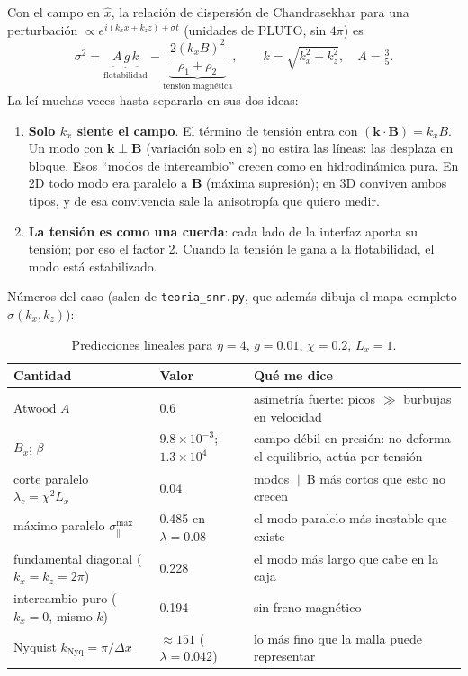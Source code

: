 \documentclass[11pt,a4paper]{article}
\begin{document}
Con el campo en $\hat{x}$, la relación de dispersión de Chandrasekhar
\cite{chandra1961} para una perturbación $\propto e^{i(k_x x+k_z z)+\sigma t}$ (unidades
de PLUTO, sin $4\pi$) es
\begin{equation}
\sigma^2 = \underbrace{A\,g\,k}_{\text{flotabilidad}}
-\underbrace{\frac{2(k_xB)^2}{\rho_1+\rho_2}}_{\text{tensión magnética}},
\qquad k=\sqrt{k_x^2+k_z^2},\quad A=\tfrac{3}{5}.
\label{eq:disp}
\end{equation}
La leí muchas veces hasta separarla en sus dos ideas:
\begin{enumerate}
  \item \textbf{Solo $k_x$ siente el campo}. El término de tensión entra con
  $(\mathbf{k}\cdot\mathbf{B})=k_xB$. Un modo con $\mathbf{k}\perp\mathbf{B}$ (variación
  solo en $z$) no estira las líneas: las desplaza en bloque. Esos ``modos de intercambio'' crecen como en hidrodinámica pura.
  En 2D todo modo era paralelo a $\mathbf{B}$ (máxima supresión); en 3D conviven ambos
  tipos, y de esa convivencia sale la anisotropía que quiero medir.
  \item \textbf{La tensión es como una cuerda}: cada lado de la interfaz aporta su
  tensión; por eso el factor 2. Cuando la tensión le gana a la flotabilidad, el modo
  está estabilizado.
\end{enumerate}

Números del caso (salen de \texttt{teoria\_snr.py}, que además dibuja el mapa completo
$\sigma(k_x,k_z)$):

\begin{table}[H]
\centering\small
\caption{Predicciones lineales para $\eta=4$, $g=0.01$, $\chi=0.2$, $L_x=1$.}
\begin{tabular}{@{}p{6.2cm}p{3.2cm}p{5.8cm}@{}}
\toprule
Cantidad & Valor & Qué me dice \\
\midrule
Atwood $A$ & 0.6 & asimetría fuerte: picos $\gg$ burbujas en velocidad \\
$B_x$; $\beta$ & $9.8\times10^{-3}$; $1.3\times10^4$ & campo débil en presión: no deforma
el equilibrio, actúa por tensión \\
corte paralelo $\lambda_c=\chi^2L_x$ & 0.04 & modos $\parallel$B más cortos que esto no crecen \\
máximo paralelo $\sigma^{\max}_\parallel$ & 0.485 en $\lambda=0.08$ & el modo paralelo
más inestable que existe \\
fundamental diagonal ($k_x=k_z=2\pi$) & 0.228 & el modo más largo que cabe en la caja \\
intercambio puro ($k_x=0$, mismo $k$) & 0.194 & sin freno magnético \\
Nyquist $k_\mathrm{Nyq}=\pi/\Delta x$ & $\approx151$ ($\lambda=0.042$) & lo más fino que
la malla puede representar \\
\bottomrule
\end{tabular}
\end{table}
\end{document}
